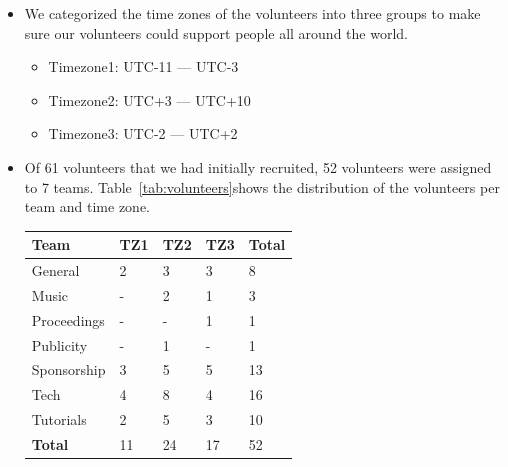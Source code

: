 \documentclass[%
10pt,								%
titlepage,						%
]
{scrartcl}
\begin{document}
        \begin{itemize}
            \item We categorized the time zones of the volunteers into three groups to make sure our volunteers could support people all around the world.
                \begin{itemize}
                    \item Timezone1: UTC-11 --- UTC-3
                    \item   Timezone2: UTC+3 --- UTC+10
                    \item   Timezone3: UTC-2 --- UTC+2
                \end{itemize}
            \item   Of 61 volunteers that we had initially recruited, 52 volunteers were assigned to 7 teams. Table~\ref{tab:volunteers}shows the distribution of the volunteers per team and time zone. 
                \begin{table}
                    \centering
                    \begin{tabular}{l|l|l|l|l}
                        \textbf{Team} & \textbf{TZ1} & \textbf{TZ2} & \textbf{TZ3} & \textbf{Total}\\ \hline
                        
                        General & 2 & 3 & 3 & 8\\
                        Music & - & 2 & 1 & 3\\
                        Proceedings & - & - & 1 & 1\\
                        Publicity & - & 1 & - & 1\\
                        Sponsorship & 3 & 5 & 5 & 13\\
                        Tech & 4 & 8 & 4 & 16\\
                        Tutorials & 2 & 5 & 3 & 10\\
                        \hline
                        \textbf{Total} & 11 & 24 & 17 & 52
                    

\end{tabular}
\end{table}
\end{itemize}
\end{document}
